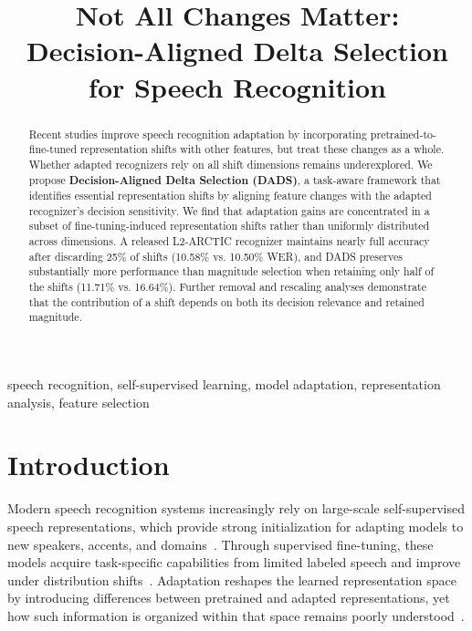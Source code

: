 \documentclass{article}
\title{Not All Changes Matter:\\Decision-Aligned Delta Selection for Speech Recognition}
\begin{document}
\ninept
\maketitle

\begin{abstract}
Recent studies improve speech recognition adaptation by incorporating pretrained-to-fine-tuned representation shifts with other features, but treat these changes as a whole. Whether adapted recognizers rely on all shift dimensions remains underexplored. We propose \textbf{Decision-Aligned Delta Selection (DADS)}, a task-aware framework that identifies essential representation shifts by aligning feature changes with the adapted recognizer's decision sensitivity. We find that adaptation gains are concentrated in a subset of fine-tuning-induced representation shifts rather than uniformly distributed across dimensions. A released L2-ARCTIC recognizer maintains nearly full accuracy after discarding 25\% of shifts (10.58\% vs. 10.50\% WER), and DADS preserves substantially more performance than magnitude selection when retaining only half of the shifts (11.71\% vs. 16.64\%). Further removal and rescaling analyses demonstrate that the contribution of a shift depends on both its decision relevance and retained magnitude.
\end{abstract}

\begin{keywords}
speech recognition, self-supervised learning, model adaptation, representation analysis, feature selection
\end{keywords}

\section{Introduction}
\label{sec:intro}
Modern speech recognition systems increasingly rely on large-scale self-supervised speech representations, which provide strong initialization for adapting models to new speakers, accents, and domains~\cite{mohamed2022review,baevski2020wav2vec,hsu2021hubert,chen2022wavlm,baevski2022data2vec,yang2021superb}. Through supervised fine-tuning, these models acquire task-specific capabilities from limited labeled speech and improve under distribution shifts~\cite{thai2026contrastive,hu2022lora,bagat2025maslora}. Adaptation reshapes the learned representation space by introducing differences between pretrained and adapted representations, yet how such information is organized within that space remains poorly understood~\cite{pasad2021layerwise,pasad2023comparative,pasad2024words,ashihara2024what,chang2023spin,chiu2024selection,niu2025factorization}.
\end{document}
